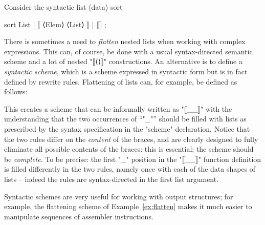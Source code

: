 \documentclass[12pt]{article} %
\newenvironment{figureunit}[1][]{\def\figureunitcaption{#1}}{\figureunitcaption}
\begin{document}
\begin{example}\label{ex:flatten}
  Consider the syntactic list (data) sort
  \begin{hacs}[xleftmargin=\parindent,xrightmargin=\parindent]
sort List | ⟦ ⟨Elem⟩ ⟨List⟩ ⟧ | ⟦⟧ ;
  \end{hacs}
  There is sometimes a need to \emph{flatten} nested lists when working with complex expressions.
  This can, of course, be done with a usual syntax-directed semantic scheme and a lot of nested
  "⟦⟨⟩⟧" constructions. An alternative is to define a \emph{syntactic scheme}, which is a scheme
  expressed in syntactic form but is in fact defined by rewrite rules. Flattening of lists can, for
  example, be defined as follows:
  This creates a scheme that can be informally written as "⟦{_}_⟧" with the understanding that the
  two occurrences of ``"_"'' should be filled with lists as prescribed by the syntax specification
  in the "scheme" declaration. Notice that the two rules differ on the \emph{content} of the braces,
  and are clearly designed to fully eliminate all possible contents of the braces: this is
  essential; the scheme should be \emph{complete}. To be precise: the first "_" position in the
  "⟦{_}_⟧" function definition is filled differently in the two rules, namely once with each of the
  data shapes of lists -- indeed the rules are syntax-directed in the first list argument.
\end{example}

Syntactic schemes are very useful for working with output structures; for example, the flattening
scheme of Example~\ref{ex:flatten} makes it much easier to manipulate sequences of assembler
instructions.

\begin{figure}[p]
  \begin{figureunit}[
      \caption{\emph{examples/Stack.hx}.}
      \label{fig:stack}
    ]
  \end{figureunit}
\end{figure}
\end{document}
